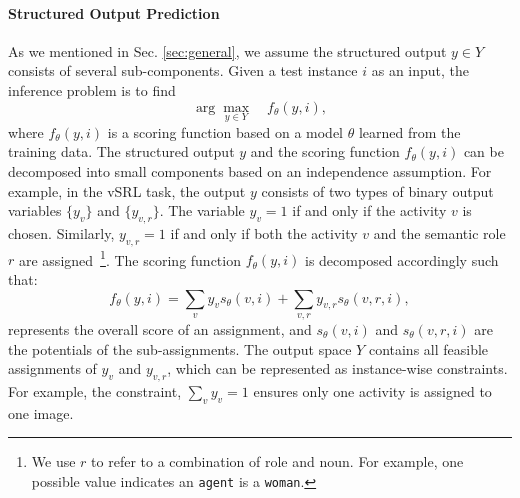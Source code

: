 

\paragraph{Structured Output Prediction}
As we mentioned in Sec. \ref{sec:general}, we assume the structured output $y \in Y$ consists of several sub-components. 
Given a test instance $i$ as an input, the inference problem is to find 
$$\arg \max_{y\in Y} \quad f_\theta (y, i),$$
where $f_\theta(y,i)$ is a scoring function based on a model $\theta$ learned from the training data. The structured output $y$ and the scoring function $f_\theta(y,i)$ can be decomposed into small components based on an independence assumption. For example, in the vSRL task, the 
output $y$ consists of two types of binary output variables $\{y_v\}$ and $\{y_{v,r}\}$.  
The variable $y_v = 1$ if and only if the activity $v$ is chosen. Similarly, $y_{v,r} = 1$ if and only if both the activity $v$ and the semantic role $r$ are assigned~\footnote{We use $r$ to refer to a combination of role and noun. For example, one possible value indicates an \texttt{agent} is a \texttt{woman}.}. 
The scoring function $f_\theta(y,i)$ is decomposed accordingly such that: $$f_\theta(y,i) = \sum_v y_v s_\theta(v,i) + \sum_{v,r}y_{v,r}s_\theta(v,r,i),$$ 
represents the overall score of an assignment, and $s_\theta(v,i)$ and $s_\theta(v,r,i)$ are the potentials of the sub-assignments. The output space $Y$ contains all feasible assignments of $y_v$ and $y_{v,r}$, which can be represented as instance-wise constraints. For example, the constraint, 
$\sum_v y_v = 1$ ensures only one activity is assigned to one image.



